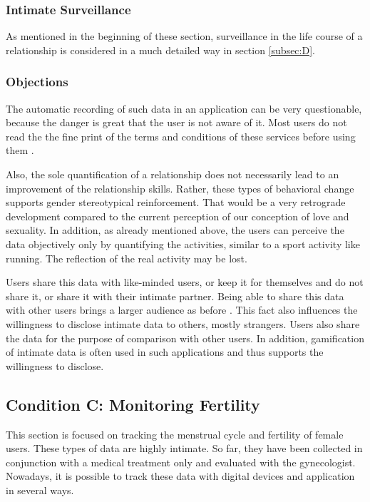 \subsubsection{Intimate Surveillance}
As mentioned in the beginning of these section, surveillance in the life course of a relationship is considered in a much detailed way in section \ref{subsec:D}.

\subsubsection{Objections}
The automatic recording of such data in an application can be very questionable, because the danger is great that the user is not aware of it. Most users do not read the the fine print of the terms and conditions of these services before using them \cite{anaya2018ethical}.

Also, the sole quantification of a relationship does not necessarily lead to an improvement of the relationship skills. Rather, these types of behavioral change supports gender stereotypical reinforcement. That would be a very retrograde development compared to the current perception of our conception of love and sexuality. %
In addition, as already mentioned above, the users can perceive the data objectively only by quantifying the activities, similar to a sport activity like running. The reflection of the real activity may be lost.

Users share this data with like-minded users, or keep it for themselves and do not share it, or share it with their intimate partner.
Being able to share this data with other users brings a larger audience as before \cite{doi:10.1080/13691058.2014.920528}. This fact also influences the willingness to disclose intimate data to others, mostly strangers.
Users also share the data for the purpose of comparison with other users. In addition, gamification of intimate data is often used in such applications and thus supports the willingness to disclose.

\subsection{Condition C: Monitoring Fertility}
\label{subsec:c}
This section is focused on tracking the menstrual cycle and fertility of female users. These types of data are highly intimate. So far, they have been collected in conjunction with a medical treatment only and evaluated with the 
gynecologist. Nowadays, it is possible to track these data with digital devices and application in several ways.
